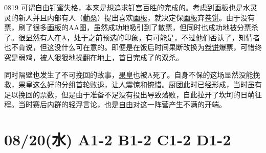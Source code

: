 
0819 可谓\uline{自由}钉蜜失格，本来是想追求\uline{钉宫}百胜的完成的。考虑到\uline{画板}也是水灵灵的新人并且内部有人（\uline{勤桑}）提出喜欢\uline{画板}，就决定保\uline{画板}弃\uline{卷饼}。由于没有票，刷了很多\uline{画板}的AA图，虽然成功地吸引到了散票，但同时也成功地被分票杀了。很显然有人在A，处于之前预选的印象，有可能是，不过他们否认了，知情者也不肯说，但这没什么可在意的。即便是在饭后时间果断改换为\uline{卷饼}爆票，可惜终究是弱鸡，被人狠狠地操翻在地上，首日完成了的双杀。

同时隔壁也发生了不可挽回的故事，\uline{果皇}也被A死了。自身不保的这场显然没能挽救，\uline{果皇}这么好的分组首轮败退，让人震惊和惋惜。厨团此时已经形成，当时虽有足以挽回的票数，但是由于准备不足没有投出导致落败，自此拉开了坎坷的日萌征程。当时赛后内群的轻浮言论，也是\uline{自由}对这一阵营产生不满的开端。

\section{08/20(水) A1-2 B1-2 C1-2 D1-2}

